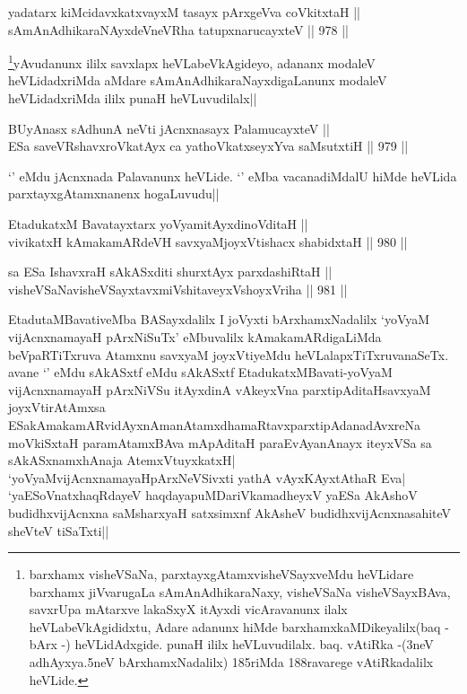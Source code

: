 \begin{shl}
yadatarx kiMcidavxkatxvayxM tasayx pArxgeVva coVkitxtaH || \\
sAmAnAdhikaraNAyxdeVneVRha tatupxnarucayxteV ||  978 ||  
\end{shl}

\begin{artha}
\footnote{barxhamx visheVSaNa, parxtayxgAtamxvisheVSayxveMdu heVLidare barxhamx jiVvarugaLa sAmAnAdhikaraNaxy, visheVSaNa visheVSayxBAva, savxrUpa mAtarxve lakaSxyX itAyxdi vicAravanunx ilalx heVLabeVkAgididxtu, Adare adanunx hiMde barxhamxkaMDikeyalilx(baq - bArx -) heVLidAdxgide. punaH ililx heVLuvudilalx. baq. vAtiRka -(3neV adhAyxya.5neV bArxhamxNadalilx) 185riMda 188ravarege vAtiRkadalilx heVLide.}yAvudanunx ililx savxlapx heVLabeVkAgideyo, adananx modaleV heVLidadxriMda aMdare sAmAnAdhikaraNayxdigaLanunx modaleV heVLidadxriMda ililx punaH heVLuvudilalx||
\end{artha}


\begin{shl}
BUyAnasx sAdhunA neVti jAcnxnasayx PalamucayxteV || \\
ESa saveVRshavxroVkatAyx ca yathoVkatxseyxYva saMsutxtiH ||  979 ||  
\end{shl}

\begin{artha}
`\stext' eMdu jAcnxnada Palavanunx heVLide. `\stext' eMba vacanadiMdalU hiMde heVLida parxtayxgAtamxnanenx hogaLuvudu||
\end{artha}


\begin{shl}
EtadukatxM Bavatayxtarx yoV\s yamitAyxdinoVditaH || \\
vivikatxH kAmakamARdeVH savxyaMjoyxVtishacx shabidxtaH ||  980 ||  
\end{shl}
				
\begin{shl}
sa ESa IshavxraH sAkASxditi shurxtAyx parxdashiRtaH || \\
visheVSaNavisheVSayxtavxmiVshitaveyxVshoyxVriha ||  981 ||  
\end{shl}

\begin{artha}
EtadutaMBavativeMba BASayxdalilx I joVyxti bArxhamxNadalilx `yoV\s yaM vijAcnxnamayaH pArxNiSuTx' eMbuvalilx kAmakamARdigaLiMda beVpaRTiTxruva Atamxnu savxyaM joyxVtiyeMdu heVLalapxTiTxruvanaSeTx. avane `\stext' eMdu sAkASxtf eMdu sAkASxtf EtadukatxMBavati-yoV\s yaM vijAcnxnamayaH pArxNiVSu itAyxdinA vAkeyxVna parxtipAditaHsavxyaM joyxVtirAtAmxsa ESakAmakamARvidAyxnAmanAtamxdhamaRtavxparxtipAdanadAvxreNa moVkiSxtaH paramAtamxBAva mApAditaH paraEvAyanAnayx iteyxVSa sa sAkASxnamxhAnaja AtemxVtuyxkatxH| `yoV\s yaMvijAcnxnamayaHpArxNeVSivxti yathA vAyxKAyxtAthaR Eva| `yaESoV\s natxhaqRdayeV haqdayapuMDariVkamadheyxV yaESa AkAshoV budidhxvijAcnxna saMsharxyaH satxsimxnf AkAsheV budidhxvijAcnxnasahiteV sheVteV tiSaTxti||
\end{artha}

